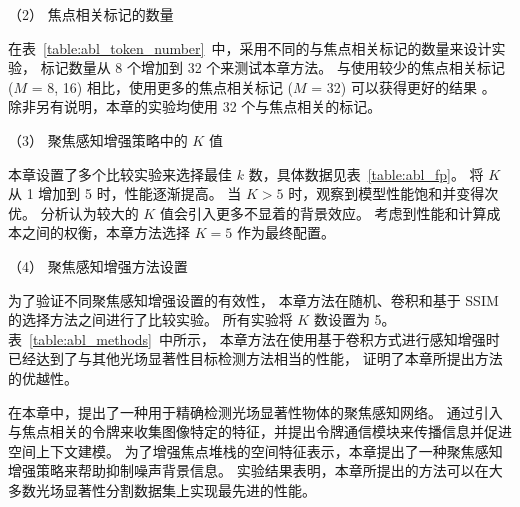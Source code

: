 



（2）
焦点相关标记的数量



在表~\ref{table:abl_token_number}~中，采用不同的与焦点相关标记的数量来设计实验，
标记数量从 8 个增加到 32 个来测试本章方法。
与使用较少的焦点相关标记 ($M$ = 8, 16) 相比，使用更多的焦点相关标记 ($M$ = 32) 可以获得更好的结果 。 
除非另有说明，本章的实验均使用 32 个与焦点相关的标记。 







（3）
聚焦感知增强策略中的 $K$ 值


本章设置了多个比较实验来选择最佳 $k$ 数，具体数据见表~\ref{table:abl_fp}。
将 $K$ 从 1 增加到 5 时，性能逐渐提高。 
当 $K > 5$ 时，观察到模型性能饱和并变得次优。 
分析认为较大的 $K$ 值会引入更多不显着的背景效应。 
考虑到性能和计算成本之间的权衡，本章方法选择 $K = 5$ 作为最终配置。


（4）
聚焦感知增强方法设置



为了验证不同聚焦感知增强设置的有效性，
本章方法在随机、卷积和基于 SSIM 的选择方法之间进行了比较实验。 
所有实验将 $K$ 数设置为 5。
表~\ref{table:abl_methods}~中所示，
本章方法在使用基于卷积方式进行感知增强时已经达到了与其他光场显著性目标检测方法相当的性能，
证明了本章所提出方法的优越性。




在本章中，提出了一种用于精确检测光场显著性物体的聚焦感知网络。 
通过引入与焦点相关的令牌来收集图像特定的特征，并提出令牌通信模块来传播信息并促进空间上下文建模。 
为了增强焦点堆栈的空间特征表示，本章提出了一种聚焦感知增强策略来帮助抑制噪声背景信息。 
实验结果表明，本章所提出的方法可以在大多数光场显著性分割数据集上实现最先进的性能。